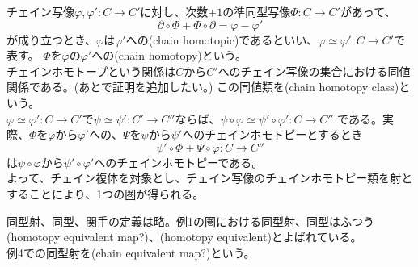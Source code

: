 \documentclass[dvipdfmx,a4paper,11pt]{jsarticle}
\begin{document}
\begin{tcolorbox}[title = 例4]
  チェイン写像$\varphi,\varphi':C\to C'$に対し、次数$+1$の準同型写像$\Phi : C\to C'$があって、
  \begin{equation*}
    \partial \circ \Phi + \Phi \circ \partial = \varphi - \varphi'
  \end{equation*}
  が成り立つとき、$\varphi$は$\varphi'$への(chain homotopic)であるといい、$\varphi \simeq \varphi' : C\to C'$で表す。
  $\Phi$を$\varphi$の$\varphi'$への(chain homotopy)という。\\
  チェインホモトープという関係は$C$から$C'$へのチェイン写像の集合における同値関係である。(あとで証明を追加したい。)
  この同値類を(chain homotopy class)という。\\
  $\varphi\simeq \varphi' : C\to C'$で$\psi \simeq \psi' :C' \to C''$ならば、$\psi \circ \varphi \simeq \psi' \circ \varphi' : C\to C''$
  である。実際、$\Phi$を$\varphi$から$\varphi'$への、$\Psi$を$\psi$から$\psi'$へのチェインホモトピーとするとき
  \begin{equation*}
    \psi'\circ \Phi + \Psi \circ \varphi : C\to C''
  \end{equation*}
  は$\psi \circ \varphi$から$\psi'\circ \varphi'$へのチェインホモトピーである。\\
  よって、チェイン複体を対象とし、チェイン写像のチェインホモトピー類を射とすることにより、1つの圏が得られる。
\end{tcolorbox}
同型射、同型、関手の定義は略。例1の圏における同型射、同型はふつう(homotopy equivalent map?)、(homotopy equivalent)とよばれている。\\
例4での同型射を(chain equivalent map?)という。
\end{document}
